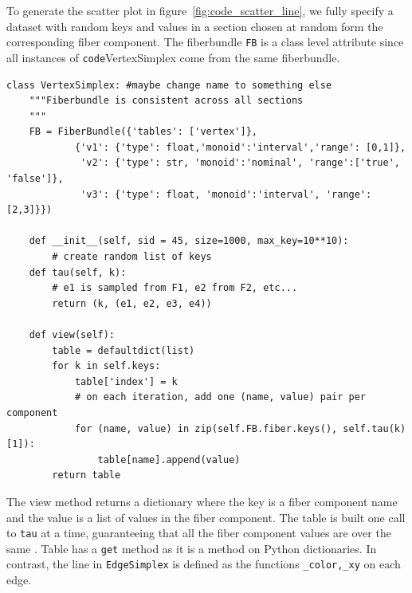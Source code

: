 \documentclass[../main.tex]{subfiles}
\begin{document}
To generate the scatter plot in figure~\ref{fig:code_scatter_line}, we fully specify a dataset with random keys and values in a section chosen at random form the corresponding fiber component. The fiberbundle \texttt{FB} is a class level attribute since all instances of \texttt{code}{VertexSimplex} come from the same fiberbundle.
\begin{verbatim}
class VertexSimplex: #maybe change name to something else
    """Fiberbundle is consistent across all sections
    """
    FB = FiberBundle({'tables': ['vertex']},  
            {'v1': {'type': float,'monoid':'interval','range': [0,1]},
             'v2': {'type': str, 'monoid':'nominal', 'range':['true', 'false']},
             'v3': {'type': float, 'monoid':'interval', 'range':[2,3]}})

    def __init__(self, sid = 45, size=1000, max_key=10**10):
        # create random list of keys
    def tau(self, k):
        # e1 is sampled from F1, e2 from F2, etc...
        return (k, (e1, e2, e3, e4))

    def view(self):
        table = defaultdict(list)
        for k in self.keys:
            table['index'] = k
            # on each iteration, add one (name, value) pair per component
            for (name, value) in zip(self.FB.fiber.keys(), self.tau(k)[1]):
                table[name].append(value)
        return table
\end{verbatim}
The view method returns a dictionary where the key is a fiber component name and the value is a list of values in the fiber component. The table is built one call to \texttt{tau} at a time, guaranteeing that all the fiber component values are over the same \dbasepoint. Table has a \texttt{get} method as it is a method on Python dictionaries. In contrast, the line in \texttt{EdgeSimplex} is defined as the functions \texttt{_color,_xy} on each edge. 
\end{document}
